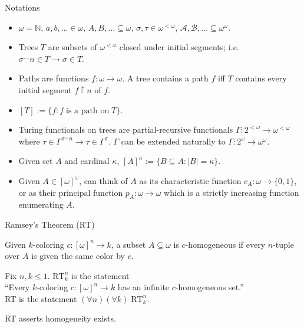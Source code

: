 \begin{frame}{Notations}
  \begin{itemize}
    \item $\omega=\mathbb{N}$, $a,b,\ldots\in\omega$,
      $A,B,\ldots\subseteq\omega$, $\sigma,\tau\in\omega^{<\omega}$,
      $\mathcal{A},\mathcal{B},\ldots\subseteq\omega^\omega$.
    \item Trees $T$ are subsets of $\omega^{<\omega}$ closed under initial
      segments; i.e. $\sigma^{\frown}n\in T \rightarrow \sigma\in T$.
    \item Paths are functions $f:\omega\rightarrow\omega$. A tree contains
      a path $f$ iff $T$ contains every initial segment $f\restriction n$
      of $f$.
    \item $[T] :=\{f:f\; \text{is a path on}\; T\}$.
    \item Turing functionals on trees are partial-recursive functionals
      $\Gamma:2^{<\omega}\rightarrow\omega^{<\omega}$ where
      $\tau\in\Gamma^{\sigma^\frown n} \rightarrow
      \tau\in\Gamma^{\sigma}$. $\Gamma$ can be extended naturally to
      $\Gamma:2^\omega\rightarrow\omega^{\omega}$.
    \item Given set $A$ and cardinal $\kappa$, $[A]^\kappa
      :=\{B\subseteq A: |B|=\kappa\}$.
    \item Given $A\in[\omega]^\omega$, can think of $A$ as its characteristic
      function $c_A:\omega\rightarrow\{0,1\}$, or as their principal
      function $p_A:\omega\rightarrow\omega$ which is a strictly increasing
      function enumerating $A$.
  \end{itemize}
\end{frame}

\begin{frame}{Ramsey's Theorem ($\text{RT}$)}
  \begin{define*}[$c$-homogeneous]
    Given $k$-coloring $c:[\omega]^n\rightarrow k$, a subset
    $A\subseteq\omega$ is $c$-homogeneous if every $n$-tuple over $A$ is
    given the same color by $c$.
  \end{define*}

  \vspace{1em}
  \begin{define*}
    Fix $n,k\leq1$. $\text{RT}_k^n$ is the statement\\
    ``Every $k$-coloring $c:[\omega]^n\rightarrow k$ has an infinite
    $c$-homogeneous set.''\\
    RT is the statement $(\forall n)(\forall k)\; \text{RT}_k^n$.
  \end{define*}

  \vspace{1em}
  RT asserts homogeneity exists.
\end{frame}

